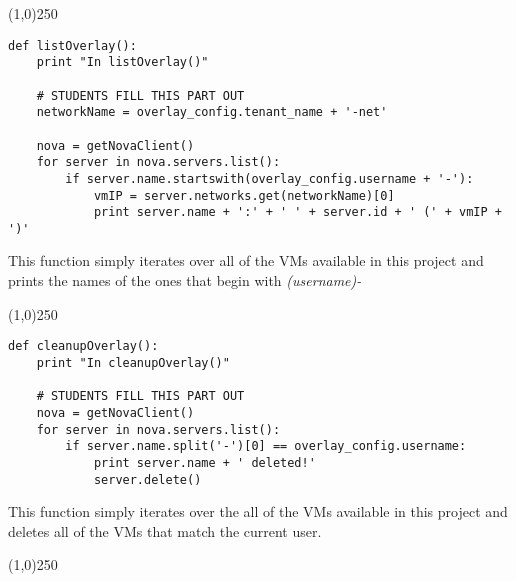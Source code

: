 \documentclass[12pt]{article}
\begin{document}
\begin{center}
	\line(1,0){250}
\end{center}

\begin{verbatim}
def listOverlay():
    print "In listOverlay()"

    # STUDENTS FILL THIS PART OUT
    networkName = overlay_config.tenant_name + '-net'

    nova = getNovaClient()
    for server in nova.servers.list():
        if server.name.startswith(overlay_config.username + '-'):
            vmIP = server.networks.get(networkName)[0]
            print server.name + ':' + ' ' + server.id + ' (' + vmIP + ')'
\end{verbatim}

This function simply iterates over all of the VMs available in this project and prints the names of the ones that begin with \textit{(username)-}


\begin{center}
	\line(1,0){250}
\end{center}
\begin{verbatim}
def cleanupOverlay():
    print "In cleanupOverlay()"

    # STUDENTS FILL THIS PART OUT
    nova = getNovaClient()
    for server in nova.servers.list():
        if server.name.split('-')[0] == overlay_config.username:
            print server.name + ' deleted!'
            server.delete()
\end{verbatim}

This function simply iterates over the all of the VMs available in this project and deletes all of the VMs that match the current user.

\begin{center}
	\line(1,0){250}
\end{center}




 
 
\end{document}

